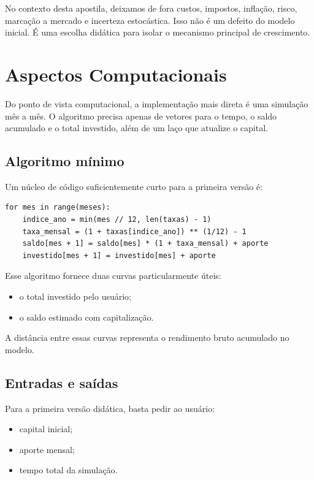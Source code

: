 \documentclass[11pt,a4paper]{article}
\begin{document}
No contexto desta apostila, deixamos de fora custos, impostos, inflação, risco,
marcação a mercado e incerteza estocástica. Isso não é um defeito do modelo inicial.
É uma escolha didática para isolar o mecanismo principal de crescimento.

\section{Aspectos Computacionais}

Do ponto de vista computacional, a implementação mais direta é uma simulação mês a
mês. O algoritmo precisa apenas de vetores para o tempo, o saldo acumulado e o total
investido, além de um laço que atualize o capital.

\subsection{Algoritmo mínimo}

Um núcleo de código suficientemente curto para a primeira versão é:

\begin{verbatim}
for mes in range(meses):
    indice_ano = min(mes // 12, len(taxas) - 1)
    taxa_mensal = (1 + taxas[indice_ano]) ** (1/12) - 1
    saldo[mes + 1] = saldo[mes] * (1 + taxa_mensal) + aporte
    investido[mes + 1] = investido[mes] + aporte
\end{verbatim}

Esse algoritmo fornece duas curvas particularmente úteis:
\begin{itemize}[leftmargin=*, itemsep=0.2em]
    \item o total investido pelo usuário;
    \item o saldo estimado com capitalização.
\end{itemize}

A distância entre essas curvas representa o rendimento bruto acumulado no modelo.

\subsection{Entradas e saídas}

Para a primeira versão didática, basta pedir ao usuário:
\begin{itemize}[leftmargin=*, itemsep=0.2em]
    \item capital inicial;
    \item aporte mensal;
    \item tempo total da simulação.
\end{itemize}
\end{document}
